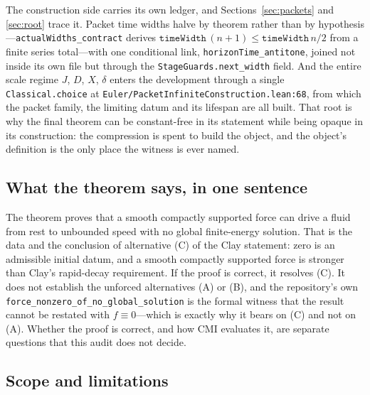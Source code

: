 \documentclass[11pt]{article}
\newcommand{\ct}[1]{\texttt{#1}}
\newcommand{\file}[1]{\texttt{\small #1}}
\theoremstyle{plain}
\theoremstyle{definition}
\theoremstyle{remark}
\begin{document}
The construction side carries its own ledger, and Sections~\ref{sec:packets} and
\ref{sec:root} trace it. Packet time widths halve by theorem rather than by
hypothesis---\ct{actualWidths\_contract} derives
$\ct{timeWidth}\,(n+1)\le \ct{timeWidth}\,n/2$ from a finite series total---with
one conditional link, \ct{horizonTime\_antitone}, joined not inside its own file
but through the \ct{StageGuards.next\_width} field. And the entire scale regime
$J$, $D$, $X$, $\delta$ enters the development through a single
\ct{Classical.choice} at \file{Euler/PacketInfiniteConstruction.lean:68}, from
which the packet family, the limiting datum and its lifespan are all built.
That root is why the final theorem can be constant-free in its statement while
being opaque in its construction: the compression is spent to build the object,
and the object's definition is the only place the witness is ever named.

\subsection{What the theorem says, in one sentence}

The theorem proves that a smooth compactly supported force can drive a fluid from
rest to unbounded speed with no global finite-energy solution. That is the data
and the conclusion of alternative (C) of the Clay statement: zero is an
admissible initial datum, and a smooth compactly supported force is stronger
than Clay's rapid-decay requirement. If the proof is correct, it resolves (C).
It does not establish the unforced alternatives (A) or (B), and the repository's
own \ct{force\_nonzero\_of\_no\_global\_solution} is the formal witness that the
result cannot be restated with $f\equiv0$---which is exactly why it bears on (C)
and not on (A). Whether the proof is correct, and how CMI evaluates it, are
separate questions that this audit does not decide.

\subsection{Scope and limitations}
\label{sec:limits}
\end{document}

